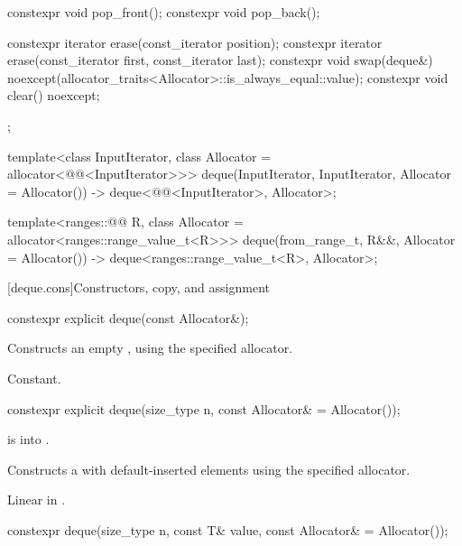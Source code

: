 \begin{codeblock}
{{    constexpr void pop_front();
    constexpr void pop_back();

    constexpr iterator erase(const_iterator position);
    constexpr iterator erase(const_iterator first, const_iterator last);
    constexpr void     swap(deque&)
      noexcept(allocator_traits<Allocator>::is_always_equal::value);
    constexpr void     clear() noexcept;
  };

  template<class InputIterator, class Allocator = allocator<@@<InputIterator>>>
    deque(InputIterator, InputIterator, Allocator = Allocator())
      -> deque<@@<InputIterator>, Allocator>;

  template<ranges::@@ R, class Allocator = allocator<ranges::range_value_t<R>>>
    deque(from_range_t, R&&, Allocator = Allocator())
      -> deque<ranges::range_value_t<R>, Allocator>;
}
\end{codeblock}

[deque.cons]{Constructors, copy, and assignment}

%
\begin{itemdecl}
constexpr explicit deque(const Allocator&);
\end{itemdecl}

\begin{itemdescr}
\pnum
\effects
Constructs an empty
,
using the specified allocator.

\pnum
\complexity
Constant.
\end{itemdescr}

%
\begin{itemdecl}
constexpr explicit deque(size_type n, const Allocator& = Allocator());
\end{itemdecl}

\begin{itemdescr}
\pnum
\expects
{} is  into .

\pnum
\effects
Constructs a  with
 default-inserted elements using the specified allocator.

\pnum
\complexity
Linear in .
\end{itemdescr}

%
\begin{itemdecl}
constexpr deque(size_type n, const T& value, const Allocator& = Allocator());
\end{itemdecl}

